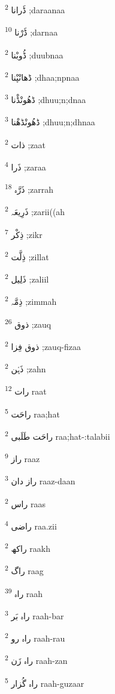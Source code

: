 \documentclass[12pt]{article}
\begin{document}
\begin{RTL}
\begin{multicols}{5}
{\ur ڈَرانا}   \textsuperscript{2} ;daraanaa

{\ur ڈَرْنا}   \textsuperscript{10} ;darnaa

{\ur ڈُوبْنا}   \textsuperscript{2} ;duubnaa

{\ur ڈھانْپْنا}   \textsuperscript{2} ;dhaa;npnaa

{\ur ڈھُونْڈْنا}   \textsuperscript{3} ;dhuu;n;dnaa

{\ur ڈھُونْڈھْنا}   \textsuperscript{3} ;dhuu;n;dhnaa

{\ur ذات}   \textsuperscript{2} ;zaat

{\ur ذَرا}   \textsuperscript{4} ;zaraa

{\ur ذَرَّہ}   \textsuperscript{18} ;zarrah

{\ur ذَرِیعَہ}   \textsuperscript{2} ;zarii((ah

{\ur ذِکْر}   \textsuperscript{7} ;zikr

{\ur ذِلَّت}   \textsuperscript{2} ;zillat

{\ur ذَلِیل}   \textsuperscript{2} ;zaliil

{\ur ذِمَّہ}   \textsuperscript{2} ;zimmah

{\ur ذوق}   \textsuperscript{26} ;zauq

{\ur ذوق فِزا}   \textsuperscript{2} ;zauq-fizaa

{\ur ذَہْن}   \textsuperscript{2} ;zahn

{\ur رات}   \textsuperscript{12} raat

{\ur راحَت}   \textsuperscript{5} raa;hat

{\ur راحَت طَلَبی}   \textsuperscript{2} raa;hat-:talabii

{\ur راز}   \textsuperscript{9} raaz

{\ur راز دان}   \textsuperscript{3} raaz-daan

{\ur راس}   \textsuperscript{2} raas

{\ur راضی}   \textsuperscript{4} raa.zii

{\ur راکھ}   \textsuperscript{2} raakh

{\ur راگ}   \textsuperscript{2} raag

{\ur راہ}   \textsuperscript{39} raah

{\ur راہ بَر}   \textsuperscript{3} raah-bar

{\ur راہ رو}   \textsuperscript{2} raah-rau

{\ur راہ زَن}   \textsuperscript{2} raah-zan

{\ur راہ گُزار}   \textsuperscript{5} raah-guzaar


\end{multicols}
\end{RTL}
\end{document}
